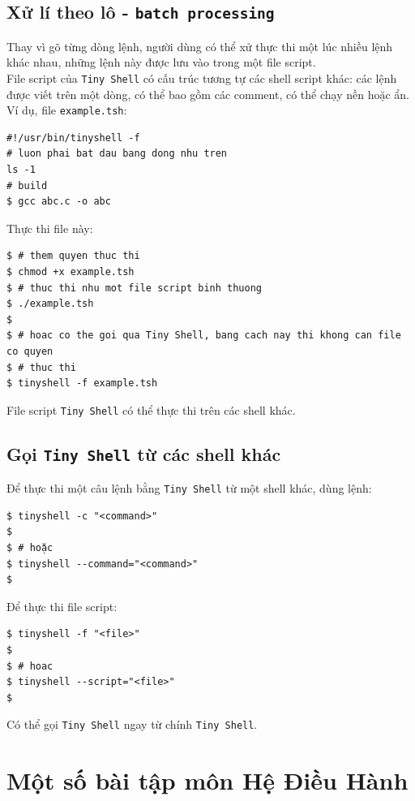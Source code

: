 \documentclass[a4paper,12pt]{report}
\begin{document}
	\section{Xử lí theo lô - \texttt{batch processing}}
        Thay vì gõ từng dòng lệnh, người dùng có thể xử thực thi một lúc nhiều
        lệnh khác nhau, những lệnh này được lưu vào trong một file script.\\
        File script của \texttt{Tiny Shell} có cấu trúc tương tự các shell
        script khác: các lệnh được viết trên một dòng, có thể bao gồm các
        comment, có thể chạy nền hoặc ẩn. Ví dụ, file \texttt{example.tsh}:
        \begin{verbatim}
#!/usr/bin/tinyshell -f
# luon phai bat dau bang dong nhu tren
ls -1
# build
$ gcc abc.c -o abc
        \end{verbatim}
        Thực thi file này:
\begin{verbatim}
$ # them quyen thuc thi
$ chmod +x example.tsh
$ # thuc thi nhu mot file script binh thuong
$ ./example.tsh
$
$ # hoac co the goi qua Tiny Shell, bang cach nay thi khong can file co quyen
$ # thuc thi
$ tinyshell -f example.tsh
        \end{verbatim}

        File script \texttt{Tiny Shell} có thể thực thi trên các shell khác.
	\section{Gọi \texttt{Tiny Shell} từ các shell khác}
        Để thực thi một câu lệnh bằng \texttt{Tiny Shell} từ một shell khác,
        dùng lệnh:
        \begin{verbatim}
$ tinyshell -c "<command>"
$ 
$ # hoặc
$ tinyshell --command="<command>"
$
        \end{verbatim}

        Để thực thi file script:
        \begin{verbatim}
$ tinyshell -f "<file>"
$
$ # hoac
$ tinyshell --script="<file>"
$
        \end{verbatim}

        Có thể gọi \texttt{Tiny Shell} ngay từ chính \texttt{Tiny Shell}.


\chapter{Một số bài tập môn Hệ Điều Hành}

        
        
        
        




\end{document}

